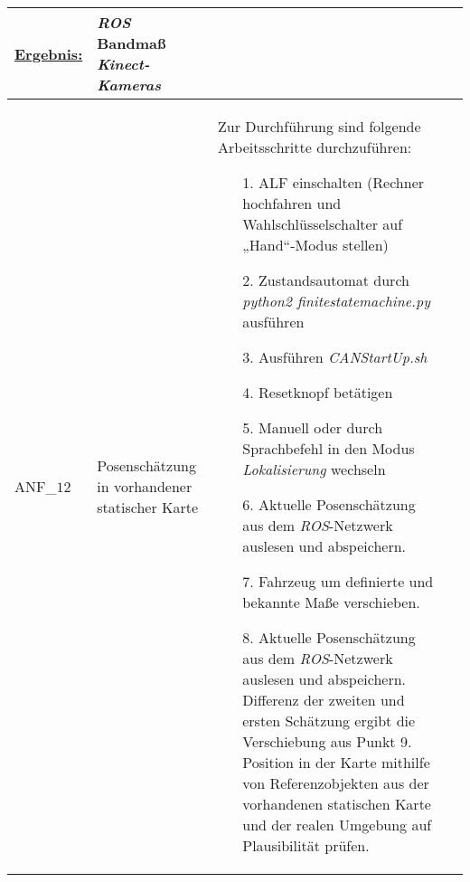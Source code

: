 \documentclass[12pt,a4paper,oneside,numbers=noenddot,captions=tableheading,toc=bibliography,openany,tikz,margin=5mm]{scrbook}
\begin{document}
\begin{longtable}{|p{}|p{}|p{7cm}|p{}|}
	\underline{Ergebnis:}\newline
	\newline
	\textbf{}%
	& \textit{ROS}\newline
	Bandmaß\newline
	\textit{Kinect-Kameras}
	\\
	\hline
	ANF\_$12$&Posenschätzung in vorhandener statischer Karte & Zur Durchführung sind folgende Arbeitsschritte durchzuführen:
	\begin{itemize}
		\item[1.]	ALF einschalten (Rechner hochfahren und Wahlschlüsselschalter auf „Hand“-Modus stellen)
		\item[2.]	Zustandsautomat durch \textit{python2 finitestatemachine.py} ausführen
		\item[3.]	Ausführen \textit{CANStartUp.sh}
		\item[4.]	Resetknopf betätigen
		\item[5.]	Manuell oder durch Sprachbefehl in den Modus \textit{\textit{Lokalisierung}} wechseln
		\item[6.]	Aktuelle Posenschätzung aus dem \textit{ROS}-Netzwerk auslesen und abspeichern.
		\item[7.]	Fahrzeug um definierte und bekannte Maße verschieben.
		\item[8.]	Aktuelle Posenschätzung aus dem \textit{ROS}-Netzwerk auslesen und abspeichern. Differenz der zweiten und ersten Schätzung ergibt die Verschiebung aus Punkt 9. Position in der Karte mithilfe von Referenzobjekten aus der vorhandenen statischen Karte und der realen Umgebung auf Plausibilität prüfen.
	\end{itemize}
	

\end{longtable}
\end{document}

